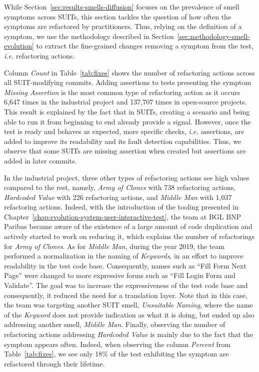 While Section~\ref{sec:results-smells-diffusion} focuses on the prevalence of smell symptoms across SUITs, this section tackles the question of how often the symptoms are refactored by practitioners. Thus, relying on the definition of a symptom, we use the methodology described in Section~\ref{sec:methodology-smell-evolution} to extract the fine-grained changes removing a symptom from the test, \emph{i.e.} refactoring actions.

Column \emph{Count} in Table~\ref{tab:fixes} shows the number of refactoring actions across all SUIT-modifying commits. Adding assertions to tests presenting the symptom \emph{Missing Assertion} is the most common type of refactoring action as it occurs 6,647 times in the industrial project and 137,707 times in open-source projects. This result is explained by the fact that in SUITs, creating a scenario and being able to run it from beginning to end already provide a signal. However, once the test is ready and behaves as expected, more specific checks, \emph{i.e.} assertions, are added to improve its readability and its fault detection capabilities. Thus, we observe that some SUITs are missing assertion when created but assertions are added in later commits. 

In the industrial project, three other types of refactoring actions see high values compared to the rest, namely, \emph{Army of Clones} with 738 refactoring actions, \emph{Hardcoded Value} with 226 refactoring actions, and \emph{Middle Man} with 1,037 refactoring actions. Indeed, with the introduction of the tooling presented in Chapter~\ref{chap:evolution-system-user-interactive-test}, the team at BGL BNP Paribas became aware of the existence of a large amount of code duplication and actively started to work on reducing it, which explains the number of refactorings for \emph{Army of Clones}. As for \emph{Middle Man}, during the year 2019, the team performed a normalization in the naming of \emph{Keywords}, in an effort to improve readability in the test code base. Consequently, names such as ``Fill Form Next Page'' were changed to more expressive forms such as ``Fill Login Form and Validate''. The goal was to increase the expressiveness of the test code base and consequently, it reduced the need for a translation layer. Note that in this case, the team was targeting another SUIT smell, \emph{Unsuitable Naming}, where the name of the \emph{Keyword} does not provide indication as what it is doing, but ended up also addressing another smell, \emph{Middle Man}. Finally, observing the number of refactoring actions addressing \emph{Hardcoded Value} is mainly due to the fact that the symptom appears often. Indeed, when observing the column \emph{Percent} from Table~\ref{tab:fixes}, we see only 18\% of the test exhibiting the symptom are refactored through their lifetime. 

